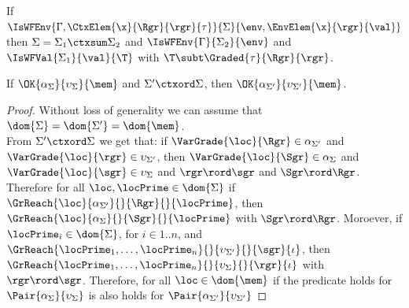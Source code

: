\begin{lemma}\label{lem:dividiEnv}
If $ \IsWFEnv{\Gamma, \CtxElem{\x}{\Rgr}{\rgr}{\tau}}{\Sigma}{\env,\EnvElem{\x}{\rgr}{\val}}$ then $\Sigma=\Sigma_1\ctxsum\Sigma_2$ and 
$ \IsWFEnv{\Gamma}{\Sigma_2}{\env}$ and $\IsWFVal{\Sigma_1}{\val}{\T}$ with $\T\subt\Graded{\tau}{\Rgr}{\rgr}$.
\end{lemma}
%

\bpa
\begin{lemma}\label{lem:lessSigma}
If $\OK{\alpha_\Sigma}{\upsilon_\Sigma}{\mem}$ and $\Sigma'\ctxord\Sigma$, then  $\OK{\alpha_{\Sigma'}}{\upsilon_{\Sigma'}}{\mem}$.
\end{lemma}
\begin{proof}  
Without loss of generality we can assume that $\dom{\Sigma}=\dom{\Sigma'}=\dom{\mem}$.\\
From $\Sigma'\ctxord\Sigma$ we get that: if $\VarGrade{\loc}{\Rgr}\in\alpha_{\Sigma'}$  and $\VarGrade{\loc}{\rgr}\in\upsilon_{\Sigma'}$, then 
$\VarGrade{\loc}{\Sgr}\in\alpha_{\Sigma}$  and $\VarGrade{\loc}{\sgr}\in\upsilon_{\Sigma}$ and $\rgr\rord\sgr$ and $\Sgr\rord\Rgr$.
Therefore for all $\loc, \locPrime\in\dom{\Sigma}$ if $\GrReach{\loc}{\alpha_{\Sigma'}}{}{\Rgr}{}{\locPrime}$, then 
$\GrReach{\loc}{\alpha_{\Sigma}}{}{\Sgr}{}{\locPrime}$ with $\Sgr\rord\Rgr$. Moroever, if $\locPrime_i\in\dom{\Sigma}$, for $i\in 1..n$,
and $\GrReach{\locPrime_1,\ldots,\locPrime_n}{}{\upsilon_{\Sigma'}}{}{\sgr}{\iota}$,
then $\GrReach{\locPrime_1,\ldots,\locPrime_n}{}{\upsilon_{\Sigma}}{}{\rgr}{\iota}$ with $\rgr\rord\sgr$. Therefore, for all $\loc\in\dom{\mem}$
if the predicate holds for $\Pair{\alpha_{\Sigma}}{\upsilon_{\Sigma}}$ is also holds for $\Pair{\alpha_{\Sigma'}}{\upsilon_{\Sigma'}}$
\end{proof}
\epa


